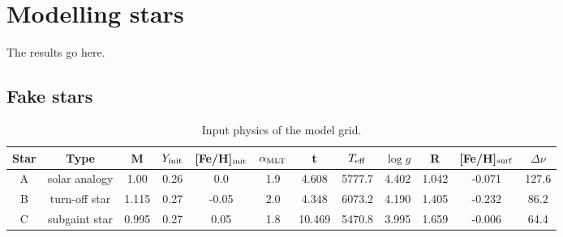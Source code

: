 \section{Modelling stars}

The results go here.
\subsection{Fake stars}
\begin{table*}
	\centering
	\caption{Input physics of the model grid.}
	\label{tab:grid}
	\begin{tabular}{cccccccccccc} %
		\hline
		Star & Type& M & $Y_{\rm init}$ & [Fe/H]$_{\rm init}$& $\alpha_{\rm MLT}$&t & $T_{\rm eff}$ & $\log g$ & R & [Fe/H]$_{\rm surf}$&$\Delta\nu$\\
        \hline
A&solar analogy&1.00&0.26& 0.0& 1.9& 4.608& 5777.7& 4.402& 1.042& -0.071& 127.6\\
B&turn-off star&1.115&0.27& -0.05& 2.0& 4.348& 6073.2& 4.190& 1.405& -0.232& 86.2\\
C&subgaint star&0.995& 0.27& 0.05& 1.8& 10.469& 5470.8& 3.995& 1.659& -0.006& 64.4\\
        \hline
	\end{tabular}
\end{table*}

